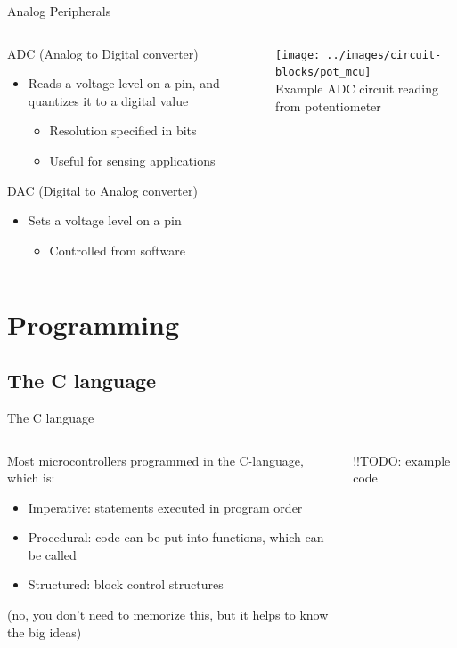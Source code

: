 \documentclass{beamer}
\begin{document}
\begin{frame}{Analog Peripherals}
  \begin{columns}[T]
    \begin{column}{.6\textwidth}
      ADC (Analog to Digital converter)
      \begin{itemize}
        \item Reads a voltage level on a pin, and quantizes it to a digital value
        \begin{itemize}
          \item Resolution specified in bits
          \item Useful for sensing applications
        \end{itemize}
      \end{itemize}
      \phantom{x}
      DAC (Digital to Analog converter)
      \begin{itemize}
        \item Sets a voltage level on a pin
        \begin{itemize}
          \item Controlled from software
        \end{itemize}
      \end{itemize}
    \end{column}

    \begin{column}{0.4\textwidth} \centering
      \texttt{[image: ../images/circuit-blocks/pot\_mcu]} \\
      Example ADC circuit reading from potentiometer
    \end{column}
  \end{columns}
\end{frame}

\section{Programming}
\subsection{The C language}
\begin{frame}{The C language}
  \begin{columns}[T]
    \begin{column}{.6\textwidth}
      Most microcontrollers programmed in the C-language, which is:
      \begin{itemize}
        \item Imperative: statements executed in program order
        \item Procedural: code can be put into functions, which can be called
        \item Structured: block control structures
      \end{itemize}
      (no, you don't need to memorize this, but it helps to know the big ideas)
    \end{column}

    \begin{column}{0.4\textwidth}
      !!TODO: example code
    \end{column}
  \end{columns}
\end{frame}
\end{document}
